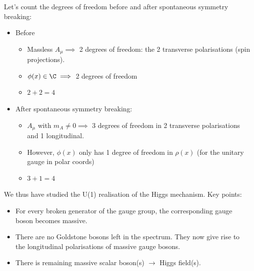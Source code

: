 \documentclass[relqm.tex]{subfiles}
\begin{document}
Let's count the degrees of freedom before and after spontaneous symmetry breaking:
\begin{itemize}
    \item Before
        \begin{itemize}
            \item Massless $A_\mu\implies$ 2 degrees of freedom: the 2 transverse polarisations (spin projections).
            \item $\phi(x)\in\C\implies$ 2 degrees of freedom
            \item $2+2=4$
        \end{itemize}
    \item After spontaneous symmetry breaking:
        \begin{itemize}
            \item $A_\mu$ with $m_A\neq0\implies$ 3 degrees of freedom in 2 transverse polarisations and 1 longitudinal. 
            \item However, $\phi(x)$ only has 1 degree of freedom in $\rho(x)$ (for the unitary gauge in polar coords)
            \item $3+1=4$
        \end{itemize}
\end{itemize}
We thus have studied the U(1) realisation of the Higgs mechanism. 
Key points:
\begin{itemize}
    \item For every broken generator of the gauge group, the corresponding gauge boson becomes massive. 
    \item There are no Goldstone bosons left in the spectrum. They now give rise to the longitudinal polarisations of massive gauge bosons. 
    \item There is remaining massive scalar boson(s) $\to$ Higgs field(s).
\end{itemize}
\end{document}
